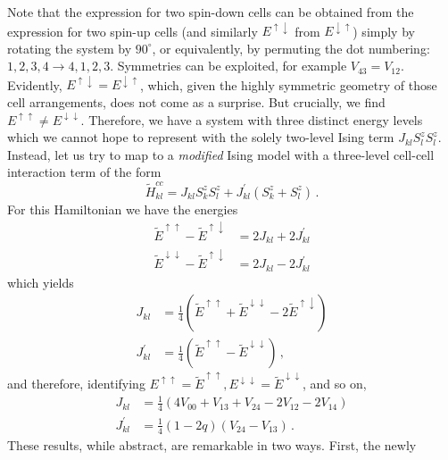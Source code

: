 Note that the expression for two spin-down cells can be obtained from the
expression for two spin-up cells (and similarly $E^{\uparrow\downarrow}$ from
$E^{\downarrow\uparrow}$) simply by rotating the system by $90^{\circ}$, or
equivalently, by permuting the dot numbering: $1,2,3,4 \rightarrow 4,1,2,3$.
Symmetries can be exploited, for example $V_{43} = V_{12}$. Evidently,
$E^{\uparrow\downarrow} = E^{\downarrow\uparrow}$, which, given the highly
symmetric geometry of those cell arrangements, does not come as a surprise. But
crucially, we find $E^{\uparrow\uparrow} \ne E^{\downarrow\downarrow}$.
Therefore, we have a system with three distinct energy levels which we cannot
hope to represent with the solely two-level Ising term $J_{kl} S^z_l S^z_l$.
Instead, let us try to map to a \emph{modified} Ising model with a three-level
cell-cell interaction term of the form
%
\begin{equation}
  \label{eq:Ising_term}
  \tilde{H}^{cc}_{kl}
  = 
  J_{kl} S^z_k S^z_l + 
  J^{\prime}_{kl} \left( S^z_k + S^z_l \right) \, .
\end{equation}
%
For this Hamiltonian we have the energies
%
\begin{align}
  \tilde{E}^{\uparrow\uparrow} - \tilde{E}^{\uparrow\downarrow}
  &=
  2J_{kl} + 2J^{\prime}_{kl} \\
  \tilde{E}^{\downarrow\downarrow} - \tilde{E}^{\uparrow\downarrow}
  &=
  2J_{kl} - 2J^{\prime}_{kl}
\end{align}
%
which yields
%
\begin{align}
  \label{eq:Js_from_Es}
  J_{kl}
  &=
  \frac{1}{4} 
  \left( 
    \tilde{E}^{\uparrow\uparrow} + \tilde{E}^{\downarrow\downarrow}
    - 2 \tilde{E}^{\uparrow\downarrow} 
  \right) \\
  J^{\prime}_{kl}
  &=
  \frac{1}{4}
  \left( \tilde{E}^{\uparrow\uparrow} - \tilde{E}^{\downarrow\downarrow} \right) \, ,
\end{align}
%
and therefore, identifying $E^{\uparrow\uparrow} = \tilde{E}^{\uparrow\uparrow},
E^{\downarrow\downarrow} = \tilde{E}^{\downarrow\downarrow}$, and so on,
\begin{align}
  \label{eq:J}
  J_{kl}
  &=
  \frac{1}{4} 
  \left(
    4 V_{00} + V_{13} + V_{24} - 2 V_{12} - 2 V_{14}
  \right) \\
  \label{eq:Jprime}
  J^{\prime}_{kl}
  &=
  \frac{1}{4}
  \left( 1 - 2 q \right)
  \left( V_{24} - V_{13} \right) \, .
\end{align}
These results, while abstract, are remarkable in two ways. First, the newly
